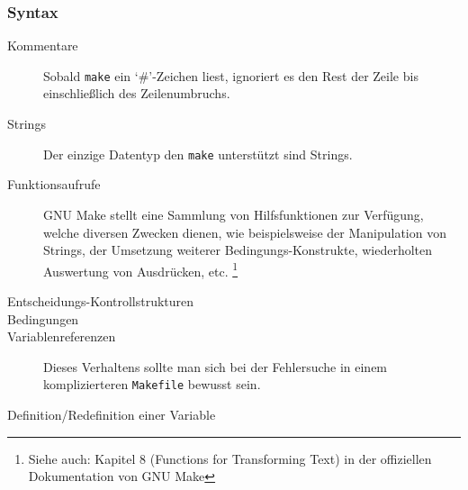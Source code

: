 \subsubsection*{Syntax}

\begin{description}
	\item[Kommentare] \hspace{\fill} 
		
		Sobald \texttt{make} ein `\#'-Zeichen liest, ignoriert es den Rest der
		Zeile bis einschließlich des Zeilenumbruchs.
	\item[Strings] \hspace{\fill} 

		Der einzige Datentyp den \texttt{make} unterstützt sind Strings.
	\item[Funktionsaufrufe] \hspace{\fill} 
		
		GNU Make stellt eine Sammlung von Hilfsfunktionen zur Verfügung, welche
		diversen Zwecken dienen, wie beispielsweise der Manipulation von
		Strings, der Umsetzung weiterer Bedingungs-Konstrukte, wiederholten
		Auswertung von Ausdrücken, etc.  \footnote{Siehe auch: Kapitel 8 (Functions
		for Transforming Text) in der offiziellen Dokumentation von GNU Make
		}
	\item[Entscheidungs-Kontrollstrukturen]	\hspace{\fill}
	
	\item[Bedingungen] \hspace{\fill} 
	\item[Variablenreferenzen] \hspace{\fill} 

		
		Dieses Verhaltens sollte man sich bei der Fehlersuche in einem
		komplizierteren \texttt{Makefile} bewusst sein.
	\item[Definition/Redefinition einer Variable] \hspace{\fill}
	


\end{description}

